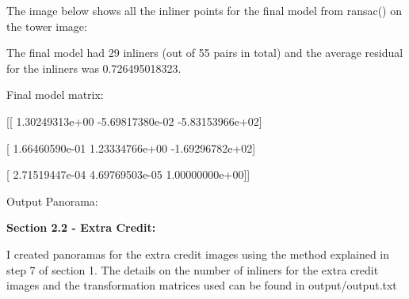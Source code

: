 \documentclass[fleqn]{article}
\begin{document}
The image below shows all the inliner points for the final model from ransac() on the tower image:
\begin{center}
\end{center}

The final model had 29 inliners (out of 55 pairs in total) and the average residual for the inliners was 0.726495018323.

Final model matrix:

[[  1.30249313e+00  -5.69817380e-02  -5.83153966e+02]

 [  1.66460590e-01   1.23334766e+00  -1.69296782e+02]

 [  2.71519447e-04   4.69769503e-05   1.00000000e+00]]

Output Panorama:
\begin{center}
\end{center}

{\bf Section 2.2 - Extra Credit:} 

I created panoramas for the extra credit images using the method explained in step 7 of section 1.
The details on the number of inliners for the extra credit images and the transformation matrices used can be found in output/output.txt
\end{document}
